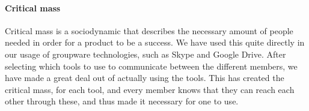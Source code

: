 \paragraph{Critical mass} \label{par:criticalmass}

Critical mass \cite{grudin1994groupware} is a sociodynamic that describes the necessary amount of people needed in order for a product to be a success. We have used this quite directly in our usage of groupware technologies, such as Skype and Google Drive. After selecting which tools to use to communicate between the different members, we have made a great deal out of actually using the tools. This has created the critical mass, for each tool, and every member knows that they can reach each other through these, and thus made it necessary for one to use.

